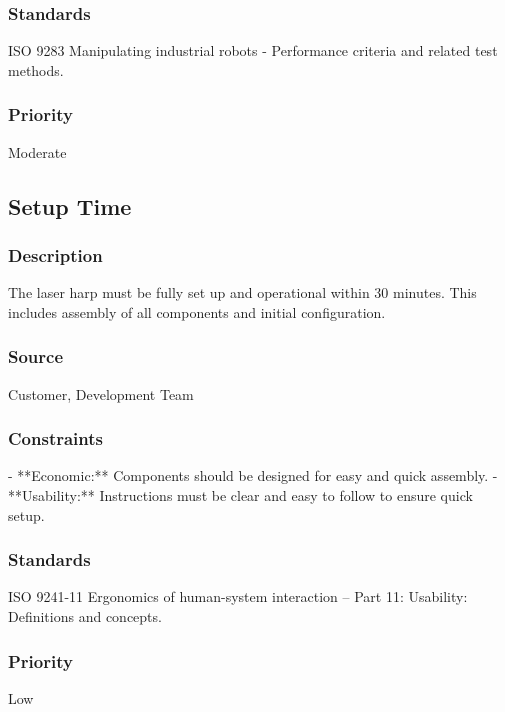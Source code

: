\subsubsection{Standards}
ISO 9283 Manipulating industrial robots - Performance criteria and related test methods.
\subsubsection{Priority}
Moderate


\subsection{Setup Time}
\subsubsection{Description}
The laser harp must be fully set up and operational within 30 minutes. This includes assembly of all components and initial configuration.
\subsubsection{Source}
Customer, Development Team
\subsubsection{Constraints}
- **Economic:** Components should be designed for easy and quick assembly.
- **Usability:** Instructions must be clear and easy to follow to ensure quick setup.
\subsubsection{Standards}
ISO 9241-11 Ergonomics of human-system interaction – Part 11: Usability: Definitions and concepts.
\subsubsection{Priority}
Low
